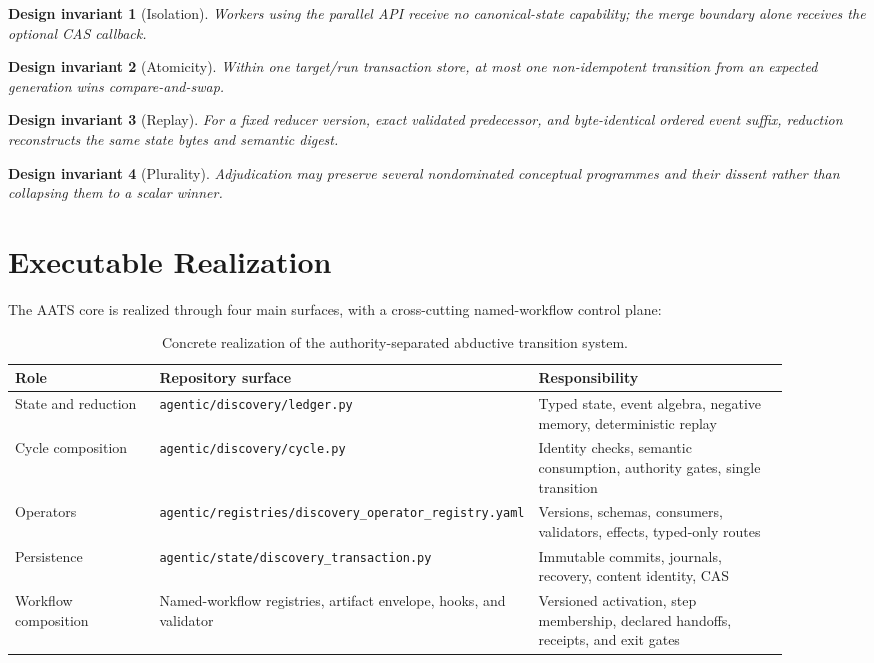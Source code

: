 \documentclass[11pt]{article}
\newtheorem{invariant}{Design invariant}
\begin{document}
\begin{invariant}[Isolation]
Workers using the parallel API receive no canonical-state capability; the merge boundary alone receives the optional CAS callback.
\end{invariant}
\begin{invariant}[Atomicity]
Within one target/run transaction store, at most one non-idempotent transition from an expected generation wins compare-and-swap.
\end{invariant}
\begin{invariant}[Replay]
For a fixed reducer version, exact validated predecessor, and byte-identical ordered event suffix, reduction reconstructs the same state bytes and semantic digest.
\end{invariant}
\begin{invariant}[Plurality]
Adjudication may preserve several nondominated conceptual programmes and their dissent rather than collapsing them to a scalar winner.
\end{invariant}

\section{Executable Realization}

The AATS core is realized through four main surfaces, with a cross-cutting named-workflow control plane:

\begin{table}[h]
\centering
\small
\begin{tabular}{p{0.21\linewidth}p{0.31\linewidth}p{0.38\linewidth}}
\toprule
Role & Repository surface & Responsibility \\
\midrule
State and reduction & \texttt{agentic/discovery/ledger.py} & Typed state, event algebra, negative memory, deterministic replay \\
Cycle composition & \texttt{agentic/discovery/cycle.py} & Identity checks, semantic consumption, authority gates, single transition \\
Operators & \texttt{agentic/registries/discovery\_operator\_registry.yaml} & Versions, schemas, consumers, validators, effects, typed-only routes \\
Persistence & \texttt{agentic/state/discovery\_transaction.py} & Immutable commits, journals, recovery, content identity, CAS \\
Workflow composition & Named-workflow registries, artifact envelope, hooks, and validator & Versioned activation, step membership, declared handoffs, receipts, and exit gates \\
\bottomrule
\end{tabular}
\caption{Concrete realization of the authority-separated abductive transition system.}
\end{table}
\end{document}
